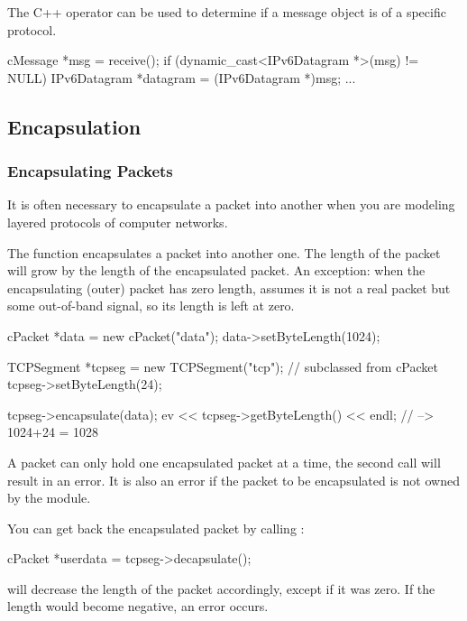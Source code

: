 The C++  operator can be used to determine
if a message object is of a specific protocol.

\begin{cpp}
cMessage *msg = receive();
if (dynamic_cast<IPv6Datagram *>(msg) != NULL)
{
    IPv6Datagram *datagram = (IPv6Datagram *)msg;
    ...
}
\end{cpp}


\subsection{Encapsulation}

\subsubsection{Encapsulating Packets}

It is often necessary to encapsulate a packet
into another when you are modeling layered protocols of computer networks.

The  function encapsulates a packet
into another one. The length of the packet will grow by the length of
the encapsulated packet. An exception: when the encapsulating (outer)
packet has zero length, {\opp} assumes it is not a real packet but
some out-of-band signal, so its length is left at zero.

\begin{cpp}
cPacket *data = new cPacket("data");
data->setByteLength(1024);

TCPSegment *tcpseg = new TCPSegment("tcp"); // subclassed from cPacket
tcpseg->setByteLength(24);

tcpseg->encapsulate(data);
ev << tcpseg->getByteLength() << endl; // --> 1024+24 = 1028
\end{cpp}

A packet can only hold one encapsulated packet at a time, the
second  call will result in an error. It is also
an error if the packet to be encapsulated is not owned by the
module.

You can get back the encapsulated packet by calling :

\begin{cpp}
cPacket *userdata = tcpseg->decapsulate();
\end{cpp}

 will decrease the length of the packet accordingly,
except if it was zero. If the length would become negative, an
error occurs.

